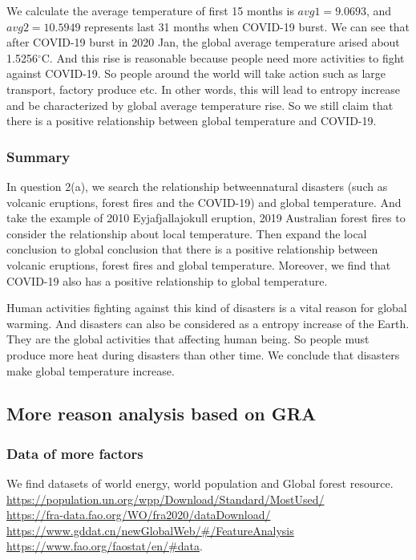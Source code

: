 \documentclass{apmcmthesis}
\def\oc{$^{\circ}$C\;}
\begin{document}
We calculate the average temperature of first 15 months is $avg1=9.0693$,
and $avg2=10.5949$ represents last 31 months when COVID-19 burst. 
We can see that after COVID-19 burst in 2020 Jan, the global average temperature arised about 1.5256\oc.
And this rise is reasonable because people need more activities to fight against COVID-19.
So people around the world will take action such as large transport, factory produce etc. 
In other words, this will lead to entropy increase and be characterized by global average temperature rise.
So we still claim that there is a positive relationship between global temperature and COVID-19.

\subsubsection{Summary}
In question 2(a), we search the relationship betweennatural disasters (such as volcanic eruptions, forest fires and the COVID-19) and global temperature.
And take the example of 2010 Eyjafjallajokull eruption, 2019 Australian forest fires to consider the relationship about local temperature.
Then expand the local conclusion to global conclusion that there is a positive relationship between volcanic eruptions, forest fires and global temperature. 
Moreover, we find that COVID-19 also has a positive relationship to global temperature.

Human activities fighting against this kind of disasters is a vital reason for global warming.
And disasters can also be considered as a entropy increase of the Earth.
They are the global activities that affecting human being.
So people must produce more heat during disasters than other time.
We conclude that disasters make global temperature increase.

\subsection{More reason analysis based on GRA }
\subsubsection{Data of more factors}
We find datasets of world energy, world population and Global forest resource. \\
\url{https://population.un.org/wpp/Download/Standard/MostUsed/}\\
\url{https://fra-data.fao.org/WO/fra2020/dataDownload/}\\
\url{https://www.gddat.cn/newGlobalWeb/#/FeatureAnalysis}\\
\url{https://www.fao.org/faostat/en/#data}.
\end{document}
